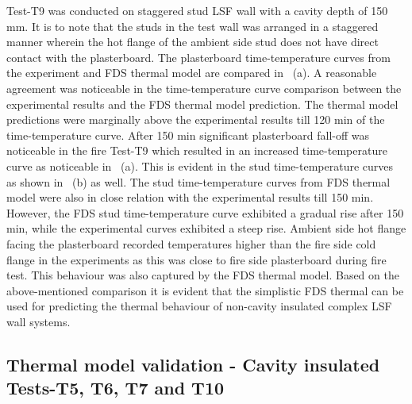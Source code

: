 Test-T9 was conducted on staggered stud LSF wall with a cavity depth of 150 mm. It is to note that the studs in the test wall was arranged in a staggered manner wherein the hot flange of the ambient side stud does not have direct contact with the plasterboard. The plasterboard time-temperature curves from the experiment and FDS thermal model are compared in ~(a). A reasonable agreement was noticeable in the time-temperature curve comparison between the experimental results and the FDS thermal model prediction. The thermal model predictions were marginally above the experimental results till 120 min of the time-temperature curve. After 150 min significant plasterboard fall-off was noticeable in the fire Test-T9 which resulted in an increased time-temperature curve as noticeable in ~(a). This is evident in the stud time-temperature curves as shown in ~(b) as well. The stud time-temperature curves from FDS thermal model were also in close relation with the experimental results till 150 min. However, the FDS stud time-temperature curve exhibited a gradual rise after 150 min, while the experimental curves exhibited a steep rise. Ambient side hot flange facing the plasterboard recorded temperatures higher than the fire side cold flange in the experiments as this was close to fire side plasterboard during fire test. This behaviour was also captured by the FDS thermal model. Based on the above-mentioned comparison it is evident that the simplistic FDS thermal can be used for predicting the thermal behaviour of non-cavity insulated complex LSF wall systems. 

\subsection{Thermal model validation - Cavity insulated Tests-T5, T6, T7 and T10}\label{sec:fds-cavity-models}

